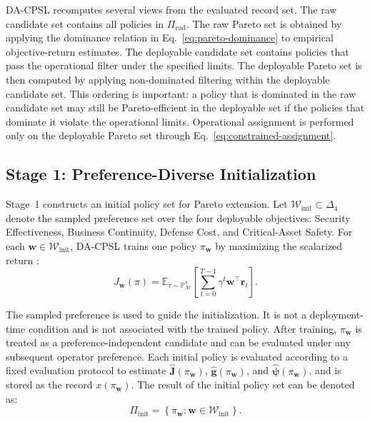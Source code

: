\documentclass[sigconf,review,anonymous]{acmart}
\begin{document}
DA-CPSL recomputes several views from the evaluated record set. The raw
candidate set contains all policies in \(\Pi_{\mathrm{cad}}\). The raw
Pareto set is obtained by applying the dominance relation in
Eq.~\ref{eq:pareto-dominance} to empirical objective-return estimates.
The deployable candidate set contains policies that pass the operational
filter under the specified limits. The deployable Pareto set is then
computed by applying non-dominated filtering within the deployable
candidate set. This ordering is important: a policy that is dominated in
the raw candidate set may still be Pareto-efficient in the deployable
set if the policies that dominate it violate the operational limits.
Operational assignment is performed only on the deployable Pareto set
through Eq.~\ref{eq:constrained-assignment}.


\subsection{Stage 1: Preference-Diverse Initialization}
\label{subsec:dacpsl-stage1}

Stage~1 constructs an initial policy set for Pareto extension.
Let \( \mathcal{W}_{\mathrm{init}}\subset\Delta_4 \)
denote the sampled preference set over the four deployable objectives: Security Effectiveness, Business Continuity, Defense Cost, and Critical-Asset Safety. 
For each \(\mathbf{w}\in\mathcal{W}_{\mathrm{init}}\), DA-CPSL trains one policy \(\pi_{\mathbf{w}}\) by maximizing the scalarized return \cite{vanmoffaert2013scalarized,yang2019generalized}:
\begin{equation}
J_{\mathbf{w}}(\pi)
=
\mathbb{E}_{\tau\sim\mathbb{P}_{\mathcal{M}}^\pi}
\left[
\sum_{t=0}^{T-1}
\gamma^t
\mathbf{w}^{\top}\mathbf{r}_t
\right].
\label{eq:stage1-scalarized-return}
\end{equation}

The sampled preference is used to guide the initialization. 
It is not a deployment-time condition and is not associated with the trained policy.
After training, \(\pi_{\mathbf{w}}\) is treated as a preference-independent candidate and can be evaluated under any subsequent operator preference. 
Each initial policy is evaluated according to a fixed evaluation protocol to estimate \(\widehat{\mathbf{J}}(\pi_{\mathbf{w}})\), \(\widehat{\mathbf{g}}(\pi_{\mathbf{w}})\), and
\(\widehat{\boldsymbol{\psi}}(\pi_{\mathbf{w}})\), and is stored as the record \(x(\pi_{\mathbf{w}})\). The result of the initial policy set can be denoted as:
\[
\Pi_{\mathrm{init}}
=
\left\{
\pi_{\mathbf{w}}:
\mathbf{w}\in\mathcal{W}_{\mathrm{init}}
\right\}.
\]
\end{document}
